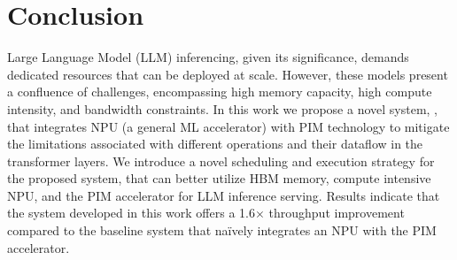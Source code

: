 \section{Conclusion}
\label{sec:conclusion}

Large Language Model (LLM) inferencing, given its significance, demands dedicated resources that can be deployed at scale. However, these models present a confluence of challenges, encompassing high memory capacity, high compute intensity, and bandwidth constraints.
%
In this work we propose a novel system, \neupims, that integrates NPU (a general ML accelerator) with PIM technology to mitigate the limitations associated with different operations and their dataflow in the transformer layers.
%
We introduce a novel scheduling and execution strategy for the proposed system, that can better utilize HBM memory, compute intensive NPU, and the PIM accelerator for LLM inference serving. 
%
Results indicate that the system developed in this work offers a 1.6$\times$ throughput improvement compared to the baseline system that na\"ively integrates an NPU with the PIM accelerator.